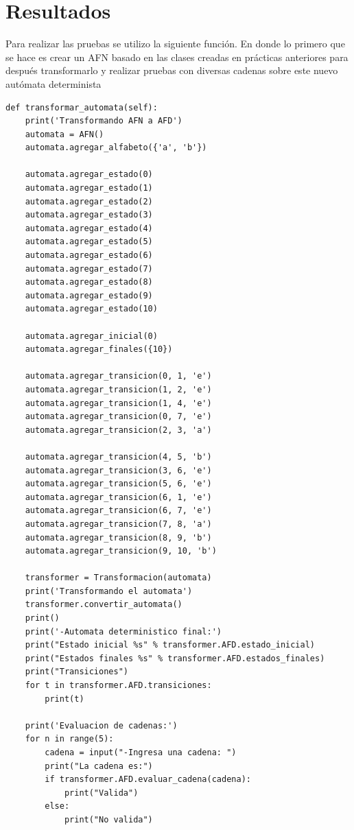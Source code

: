 \documentclass[titlepage]{article}
\begin{document}
\section{Resultados}
Para realizar las pruebas se utilizo la siguiente función. En donde lo primero que se hace es crear un AFN basado en las clases creadas en prácticas anteriores para después transformarlo y realizar pruebas con diversas cadenas sobre este nuevo autómata determinista
\begin{lstlisting}
def transformar_automata(self):
	print('Transformando AFN a AFD')
	automata = AFN()
	automata.agregar_alfabeto({'a', 'b'})
	
	automata.agregar_estado(0)
	automata.agregar_estado(1)
	automata.agregar_estado(2)
	automata.agregar_estado(3)
	automata.agregar_estado(4)
	automata.agregar_estado(5)
	automata.agregar_estado(6)
	automata.agregar_estado(7)
	automata.agregar_estado(8)
	automata.agregar_estado(9)
	automata.agregar_estado(10)
	
	automata.agregar_inicial(0)
	automata.agregar_finales({10})
	
	automata.agregar_transicion(0, 1, 'e')
	automata.agregar_transicion(1, 2, 'e')
	automata.agregar_transicion(1, 4, 'e')
	automata.agregar_transicion(0, 7, 'e')
	automata.agregar_transicion(2, 3, 'a')
	
	automata.agregar_transicion(4, 5, 'b')
	automata.agregar_transicion(3, 6, 'e')
	automata.agregar_transicion(5, 6, 'e')
	automata.agregar_transicion(6, 1, 'e')
	automata.agregar_transicion(6, 7, 'e')
	automata.agregar_transicion(7, 8, 'a')
	automata.agregar_transicion(8, 9, 'b')
	automata.agregar_transicion(9, 10, 'b')
	
	transformer = Transformacion(automata)
	print('Transformando el automata')
	transformer.convertir_automata()
	print()
	print('-Automata deterministico final:')
	print("Estado inicial %s" % transformer.AFD.estado_inicial)
	print("Estados finales %s" % transformer.AFD.estados_finales)
	print("Transiciones")
	for t in transformer.AFD.transiciones:
		print(t)
	
	print('Evaluacion de cadenas:')
	for n in range(5):
		cadena = input("-Ingresa una cadena: ")
		print("La cadena es:")
		if transformer.AFD.evaluar_cadena(cadena):
			print("Valida")
		else:
			print("No valida")
\end{lstlisting}
\end{document}
